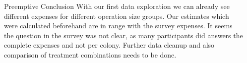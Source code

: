 \documentclass{beamer}
\begin{document}
\begin{frame}{}
\begin{columns}[t]
\begin{column}{0.49\textwidth}
    {
      \begin{block}{Preemptive Conclusion}
        With our first data exploration we can already see different expenses for different operation size groups. Our estimates which were calculated beforehand are in range with the survey expenses. It seems the question in the survey was not clear, as many participants did answers the complete expenses and not per colony. Further data cleanup and also comparison of treatment combinations needs to be done.
      \end{block}
    }

  \end{column}
  \begin{column}{0.49\textwidth}


\end{column}
\end{columns}
\end{frame}
\end{document}
